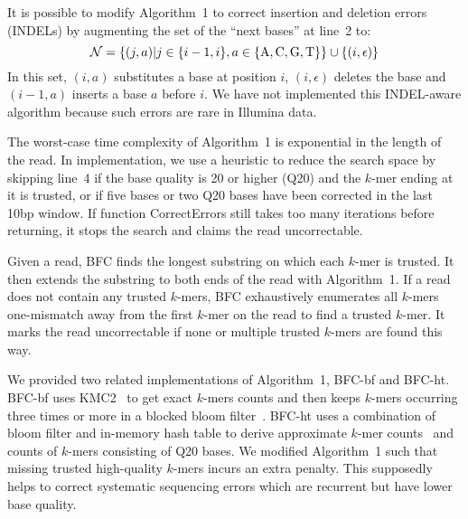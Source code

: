\documentclass{bioinfo}
\begin{document}
\begin{methods}
It is possible to modify Algorithm~1 to correct insertion and deletion
errors (INDELs) by augmenting the set of the ``next bases'' at line~2 to:
$$\mathcal{N}=\{(j,a)|j\in\{i-1,i\},a\in\{{\rm A},{\rm C},{\rm G},{\rm T}\}\}\cup\{(i,\epsilon)\}$$
In this set, $(i,a)$ substitutes a base at position $i$, $(i,\epsilon)$ deletes
the base and $(i-1,a)$ inserts a base $a$ before $i$. We have not
implemented this INDEL-aware algorithm because such
errors are rare in Illumina data.

The worst-case time complexity of Algorithm~1 is exponential in the length of
the read. In implementation, we use a heuristic to reduce the search space by
skipping line~4 if the base quality is 20 or higher (Q20) and the $k$-mer
ending at it is trusted, or if five bases or two Q20 bases have been corrected
in the last 10bp window. If function {\sc CorrectErrors} still takes too
many iterations before returning, it stops the search and claims the read uncorrectable.

Given a read, BFC finds the longest substring on which each $k$-mer is trusted. It
then extends the substring to both ends of the read with Algorithm~1. If a read
does not contain any trusted $k$-mers, BFC exhaustively enumerates all $k$-mers
one-mismatch away from the first $k$-mer on the read to find a trusted
$k$-mer. It marks the read uncorrectable if none or multiple trusted $k$-mers
are found this way.

We provided two related implementations of Algorithm~1, BFC-bf and BFC-ht.
BFC-bf uses KMC2~\citep{kmc2} to get exact $k$-mers counts and then keeps
$k$-mers occurring three times or more in a blocked bloom
filter~\citep{DBLP:conf/wea/PutzeSS07}. BFC-ht uses a combination of bloom
filter and in-memory hash table to derive approximate $k$-mer
counts~\citep{Melsted:2011bh} and counts of $k$-mers consisting of Q20 bases.
We modified Algorithm~1 such that missing trusted high-quality $k$-mers incurs
an extra penalty. This supposedly helps to correct systematic sequencing errors
which are recurrent but have lower base quality.


\end{methods}
\end{document}
